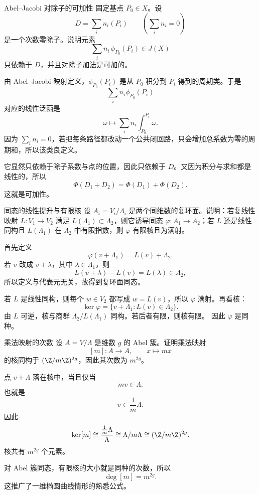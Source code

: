 \begin{problem}{Abel--Jacobi 对除子的可加性}
\medium
固定基点 $P_0\in X$。设
\[
D=\sum_i n_i(P_i)
\qquad \left(\sum_i n_i=0\right)
\]
是一个次数零除子。说明元素
\[
\sum_i n_i\,\phi_{P_0}(P_i)\in J(X)
\]
只依赖于 $D$，并且对除子加法是可加的。
\end{problem}
\begin{solution}
由 Abel--Jacobi 映射定义，$\phi_{P_0}(P_i)$ 是从 $P_0$ 积分到 $P_i$ 得到的周期类。于是
\[
\sum_i n_i\phi_{P_0}(P_i)
\]
对应的线性泛函是
\[
\omega\longmapsto \sum_i n_i\int_{P_0}^{P_i}\omega.
\]
因为 $\sum_i n_i=0$，若把每条路径都改动一个公共闭回路，只会增加总系数为零的周期和，所以该类良定义。

它显然只依赖于除子系数与点的位置，因此只依赖于 $D$。又因为积分与求和都是线性的，所以
\[
\Phi(D_1+D_2)=\Phi(D_1)+\Phi(D_2).
\]
这就是可加性。
\end{solution}

\begin{problem}{同态的线性提升与有限核}
\medium
设 $A_i=V_i/\Lambda_i$ 是两个同维数的复环面。说明：若复线性映射 $L:V_1\to V_2$ 满足 $L(\Lambda_1)\subset \Lambda_2$，则它诱导同态 $\varphi:A_1\to A_2$；若 $L$ 还是线性同构且 $L(\Lambda_1)$ 在 $\Lambda_2$ 中有限指数，则 $\varphi$ 有限核且为满射。
\end{problem}
\begin{solution}
首先定义
\[
\varphi(v+\Lambda_1)=L(v)+\Lambda_2.
\]
若 $v$ 改成 $v+\lambda$，其中 $\lambda\in\Lambda_1$，则
\[
L(v+\lambda)-L(v)=L(\lambda)\in\Lambda_2,
\]
所以定义与代表元无关，故得到复环面同态。

若 $L$ 是线性同构，则每个 $w\in V_2$ 都写成 $w=L(v)$，所以 $\varphi$ 满射。再看核：
\[
\ker\varphi=\{v+\Lambda_1: L(v)\in \Lambda_2\}.
\]
由 $L$ 可逆，核与商群 $\Lambda_2/L(\Lambda_1)$ 同构。若后者有限，则核有限。
因此 $\varphi$ 是同种。
\end{solution}

\begin{problem}{乘法映射的次数}
\medium
设 $A=V/\Lambda$ 是维数 $g$ 的 Abel 簇。证明乘法映射
\[
[m]:A\to A,
\qquad x\longmapsto mx
\]
的核同构于 $(\Z/m\Z)^{2g}$，因此其次数为 $m^{2g}$。
\end{problem}
\begin{solution}
点 $v+\Lambda$ 落在核中，当且仅当
\[
mv\in \Lambda.
\]
也就是
\[
v\in \frac{1}{m}\Lambda.
\]
因此
\[
\ker[m]\cong \frac{\frac{1}{m}\Lambda}{\Lambda}\cong \Lambda/m\Lambda\cong (\Z/m\Z)^{2g}.
\]
核共有 $m^{2g}$ 个元素。

对 Abel 簇同态，有限核的大小就是同种的次数，所以
\[
\deg[m]=m^{2g}.
\]
这推广了一维椭圆曲线情形的熟悉公式。
\end{solution}


